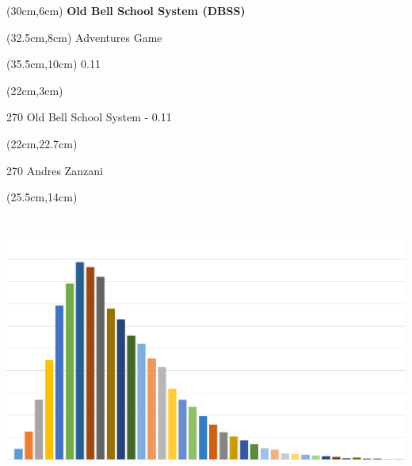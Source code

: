 \documentclass[10pt,a4paper]{article}
\def \versione {0.11}
\begin{document}
\pdfpagewidth=459.26mm
\thispagestyle{empty}

\begin{textblock*}{20cm}(30cm,6cm) %
\Huge \textbf{Old Bell School System (DBSS)}\\

\end{textblock*}

\begin{textblock*}{20cm}(32.5cm,8cm) %
\calligra\Huge{Adventures Game}\\

\end{textblock*}

\begin{textblock*}{20cm}(35.5cm,10cm) %
		{\LARGE \versione}
\end{textblock*}

\begin{textblock*}{20cm}(22cm,3cm) %
\begin{turn}{270}
	{\Huge Old Bell School System - \versione}\\
\end{turn}
\end{textblock*}


\begin{textblock*}{20cm}(22cm,22.7cm) %
\begin{turn}{270}
	{\Huge Andres Zanzani}
\end{turn}
\end{textblock*}



\begin{textblock*}{20cm}(25.5cm,14cm) %
	\includegraphics[bb=0 0 1148 636,width=6.85139in,height=3.79514in]{copertina.png}
\end{textblock*}
\end{document}
